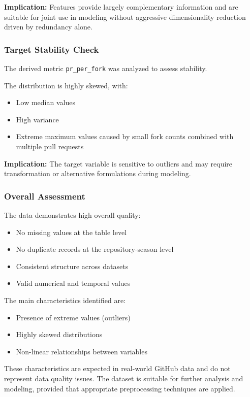 \textbf{Implication:} Features provide largely complementary information and are suitable for joint use in modeling without aggressive dimensionality reduction driven by redundancy alone.

\subsubsection{Target Stability Check}

The derived metric \texttt{pr\_per\_fork} was analyzed to assess stability.

The distribution is highly skewed, with:
\begin{itemize}
    \item Low median values
    \item High variance
    \item Extreme maximum values caused by small fork counts combined with multiple pull requests
\end{itemize}

\textbf{Implication:} The target variable is sensitive to outliers and may require transformation or alternative formulations during modeling.

\subsubsection{Overall Assessment}

The data demonstrates high overall quality:

\begin{itemize}
    \item No missing values at the table level
    \item No duplicate records at the repository-season level
    \item Consistent structure across datasets
    \item Valid numerical and temporal values
\end{itemize}

The main characteristics identified are:

\begin{itemize}
    \item Presence of extreme values (outliers)
    \item Highly skewed distributions
    \item Non-linear relationships between variables
\end{itemize}

These characteristics are expected in real-world GitHub data and do not represent data quality issues. The dataset is suitable for further analysis and modeling, provided that appropriate preprocessing techniques are applied.


